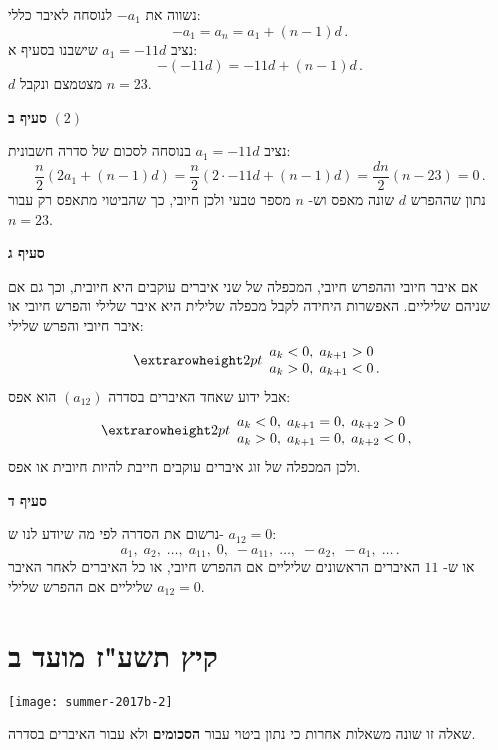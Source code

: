 נשווה את
$-a_1$
לנוסחה לאיבר כללי:
\[
-a_1 = a_n = a_1 + (n-1)d\,.
\]
נציב
$a_1=-11d$
שישבנו בסעיף א:
\[
-(-11d) = -11d + (n-1)d\,.
\]
$d$
מצטמצם ונקבל
$n=23$.

\smallskip

\textbf{סעיף ב}
$(2)$

נציב
$a_1=-11d$
 בנוסחה לסכום של סדרה חשבונית:
\[
\frac{n}{2}(2a_1+(n-1)d) = \frac{n}{2}(2\cdot -11d+(n-1)d) =\frac{dn}{2} (n-23)=0\,.
\]
נתון שההפרש 
$d$
שונה מאפס וש-%
$n$
מספר טבעי ולכן חיובי, כך שהביטוי מתאפס רק עבור
$n=23$.

\np

\textbf{סעיף ג}

אם איבר חיובי וההפרש חיובי, המכפלה של שני איברים עוקבים היא חיובית, וכך גם אם שניהם שליליים. האפשרות היחידה לקבל מכפלה שלילית היא איבר שלילי והפרש חיובי או איבר חיובי והפרש שלילי:
\[
\erh{2pt}
\begin{array}{l}
a_k<0,\; a_{k+1}>0\\
a_k>0,\; a_{k+1}<0\,.
\end{array}
\]
אבל ידוע שאחד האיברים בסדרה 
$(a_{12})$
הוא אפס:
\[
\erh{2pt}
\begin{array}{l}
a_k<0,\; a_{k+1}=0,\; a_{k+2}>0\\
a_k>0,\; a_{k+1}=0,\; a_{k+2}<0\,,
\end{array}
\]
ולכן המכפלה של זוג איברים עוקבים חייבת להיות חיובית או אפס.

\smallskip

\textbf{סעיף ד}

נרשום את הסדרה לפי מה שיודע לנו ש-%
$a_{12}=0$:
\[
a_1,\; a_2,\; \ldots,\; a_{11},\; 0,\; -a_{11},\; \ldots,\; -a_2,\; -a_1,\; \ldots\,.
\]
או ש-%
$11$
האיברים הראשונים שליליים אם ההפרש חיובי, או כל האיברים לאחר האיבר
$a_{12}=0$
שליליים אם ההפרש שלילי.



\np
\section{קיץ תשע"ז מועד ב}

\begin{center}
\texttt{[image: summer-2017b-2]}
\end{center}

שאלה זו שונה משאלות אחרות כי נתון ביטוי עבור
\textbf{הסכומים}
ולא עבור האיברים בסדרה.

\smallskip


